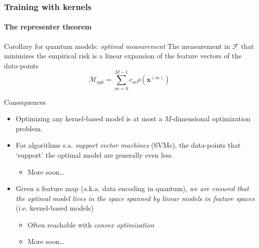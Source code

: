 \documentclass[aspectratio=43]{beamer}
\begin{document}
\begin{frame}
  \frametitle{Training with kernels}
  \framesubtitle{The representer theorem}
  
  \footnotesize
  \begin{block}{Corollary for quantum models: \emph{optimal measurement}}
    The measurement in $\mathcal{F}$ that minimizes the empirical risk is a linear expansion of the feature vectors of the data-points
    \[\mathcal{M}_{\mathrm{opt}} = \sum_{m=0}^{M-1} c_m \rho\left( \mathbf{x}^{(m)} \right)\]
  \end{block}

  \pause
  Consequences
  \begin{itemize}
    \item<2-> Optimizing any kernel-based model is at most a $M$-dimensional optimization problem.
    \item<3-> For algorithms s.a. \emph{support vector machines} (SVMs), the data-points that `support' the optimal model are generally even less.
    \begin{itemize}
      \item More soon\dots
    \end{itemize}
    \item<4-> Given a feature map (a.k.a. data encoding in quantum), \emph{we are ensured that the optimal model lives in the space spanned by linear models in feature spaces} (i.e. kernel-based models)
    \begin{itemize}
      \item Often reachable with \emph{convex optimization}
      \item More soon\dots
    \end{itemize}
  \end{itemize}

\end{frame}
\end{document}
